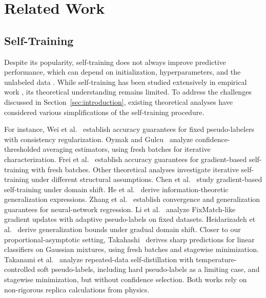 \section{Related Work}
\label{sec:related-work}

\subsection{Self-Training}
\label{subsec:st}

Despite its popularity, self-training does not always improve
predictive performance, which can depend on initialization,
hyperparameters, and the unlabeled data
\cite{oliver2018realistic,su2021realistic}.
While self-training has been studied extensively in empirical work
\cite{amini2025survey,vanengelen2020survey,yang2023survey,kage2026review},
its theoretical understanding remains limited.
To address the challenges discussed in Section~\ref{sec:introduction},
existing theoretical analyses have considered various
simplifications of the self-training procedure.

For instance, Wei et al.~\cite{wei2021theoretical} establish accuracy guarantees
for fixed pseudo-labelers with consistency regularization.
Oymak and Gulcu~\cite{oymak2020} analyze confidence-thresholded
averaging estimators, using fresh batches for iterative characterization.
Frei et al.~\cite{frei2022selftraining} establish accuracy guarantees
for gradient-based self-training with fresh batches.
Other theoretical analyses investigate iterative
self-training under different structural assumptions.
Chen et al.~\cite{chen2020selftraining} study gradient-based
self-training under domain shift.
He et al.~\cite{he2022information} derive information-theoretic
generalization expressions.
Zhang et al.~\cite{zhang2022unlabeled} establish convergence and
generalization guarantees for neural-network regression.
Li et al.~\cite{li2025fixmatch} analyze FixMatch-like
gradient updates with adaptive pseudo-labels on fixed datasets.
Heidarizadeh et al.~\cite{heidarizadeh2026confidence} derive
generalization bounds under gradual domain shift.
Closer to our proportional-asymptotic setting,
Takahashi~\cite{takahashi2026role} derives sharp predictions
for linear classifiers on Gaussian mixtures, using fresh batches
and stagewise minimization.
Takanami et al.~\cite{takanami2025effect} analyze repeated-data
self-distillation with temperature-controlled soft pseudo-labels,
including hard pseudo-labels as a limiting case, and stagewise
minimization, but without confidence selection.
Both works rely on non-rigorous replica calculations from physics.

